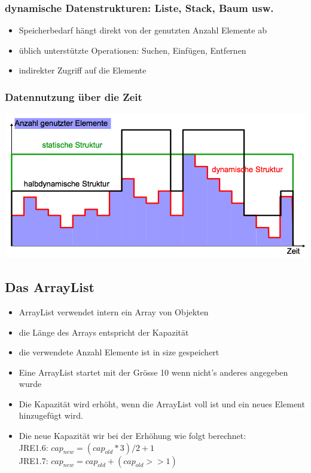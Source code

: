 \documentclass[a4paper,10pt]{article}
\begin{document}
\subsubsection{dynamische Datenstrukturen: Liste, Stack, Baum usw.}
\begin{itemize}
	\item Speicherbedarf h\"angt direkt von der genutzten Anzahl Elemente ab
	\item \"ublich unterst\"utzte Operationen: Suchen, Einf\"ugen, Entfernen
	\item indirekter Zugriff auf die Elemente
\end{itemize}

\subsubsection{Datennutzung \"uber die Zeit}
\includegraphics[width=150mm]{datennutzung_ueber_zeit.png}

\subsection{Das ArrayList}
\begin{itemize}
	\item ArrayList verwendet intern ein Array von Objekten
	\item die L\"ange des Arrays entspricht der Kapazit\"at
	\item die verwendete Anzahl Elemente ist in size gespeichert
	\item Eine ArrayList startet mit der Gr\"osse 10 wenn nicht's anderes angegeben wurde
	\item Die Kapazit\"at wird erh\"oht, wenn die ArrayList voll ist und ein neues Element hinzugef\"ugt wird.
	\item Die neue Kapazit\"at wir bei der Erh\"ohung wie folgt berechnet:\\
			JRE1.6: $cap_{new}=(cap_{old} * 3) / 2 + 1$\\
			JRE1.7: $cap_{new}=cap_{old} + (cap_{old} >> 1)$
\end{itemize}
\end{document}
